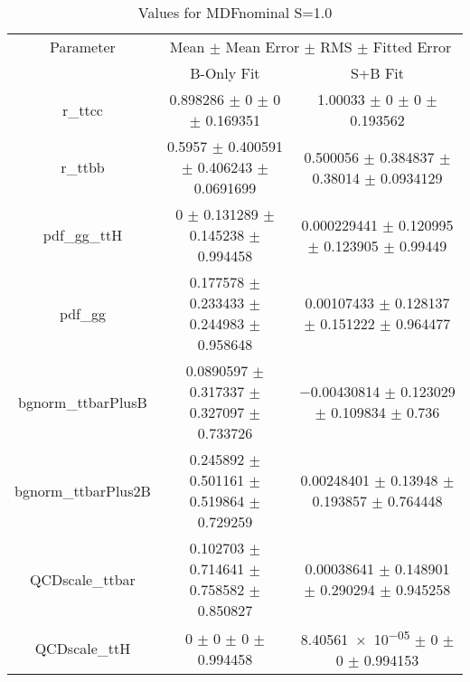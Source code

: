 \begin{table}
\centering
\caption{Values for MDFnominal S=1.0}
\begin{tabular}{ccc}
\toprule
Parameter & \multicolumn{2}{c}{Mean $\pm$ Mean Error $\pm$ RMS $\pm$ Fitted Error}\\
 & B-Only Fit & S+B Fit\\
\midrule
r\_ttcc & \num{0.898286} $\pm$ \num{0} $\pm$ \num{0} $\pm$ \num{0.169351} & \num{1.00033} $\pm$ \num{0} $\pm$ \num{0} $\pm$ \num{0.193562}\\
r\_ttbb & \num{0.5957} $\pm$ \num{0.400591} $\pm$ \num{0.406243} $\pm$ \num{0.0691699} & \num{0.500056} $\pm$ \num{0.384837} $\pm$ \num{0.38014} $\pm$ \num{0.0934129}\\
pdf\_gg\_ttH & \num{0} $\pm$ \num{0.131289} $\pm$ \num{0.145238} $\pm$ \num{0.994458} & \num{0.000229441} $\pm$ \num{0.120995} $\pm$ \num{0.123905} $\pm$ \num{0.99449}\\
pdf\_gg & \num{0.177578} $\pm$ \num{0.233433} $\pm$ \num{0.244983} $\pm$ \num{0.958648} & \num{0.00107433} $\pm$ \num{0.128137} $\pm$ \num{0.151222} $\pm$ \num{0.964477}\\
bgnorm\_ttbarPlusB & \num{0.0890597} $\pm$ \num{0.317337} $\pm$ \num{0.327097} $\pm$ \num{0.733726} & \num{-0.00430814} $\pm$ \num{0.123029} $\pm$ \num{0.109834} $\pm$ \num{0.736}\\
bgnorm\_ttbarPlus2B & \num{0.245892} $\pm$ \num{0.501161} $\pm$ \num{0.519864} $\pm$ \num{0.729259} & \num{0.00248401} $\pm$ \num{0.13948} $\pm$ \num{0.193857} $\pm$ \num{0.764448}\\
QCDscale\_ttbar & \num{0.102703} $\pm$ \num{0.714641} $\pm$ \num{0.758582} $\pm$ \num{0.850827} & \num{0.00038641} $\pm$ \num{0.148901} $\pm$ \num{0.290294} $\pm$ \num{0.945258}\\
QCDscale\_ttH & \num{0} $\pm$ \num{0} $\pm$ \num{0} $\pm$ \num{0.994458} & \num{8.40561e-05} $\pm$ \num{0} $\pm$ \num{0} $\pm$ \num{0.994153}\\
\bottomrule
\end{tabular}
\end{table}
